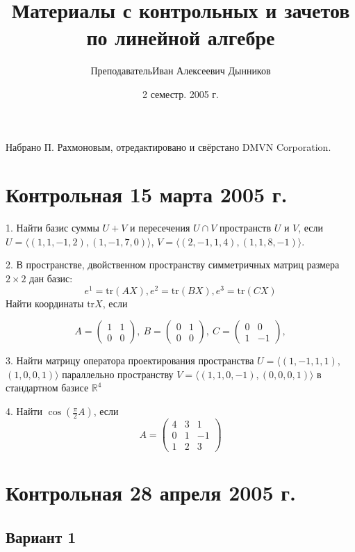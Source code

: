 \documentclass[a4paper]{article}
\title{Материалы с контрольных и зачетов по линейной алгебре}
\author{Преподаватель\т Иван Алексеевич Дынников}
\date{2 семестр. 2005 г.}
\begin{document}
\maketitle
\centerline{\small Набрано П. Рахмоновым, отредактировано и свёрстано DMVN Corporation.}

\medskip
\dmvntrail

\section{Контрольная 15 марта 2005 г.}

1. Найти базис суммы $U+V$ и пересечения $U\cap V$ пространств $U$
и $V$, если $U=\langle(1, 1, -1, 2), (1, -1, 7, 0)\rangle$,
$V=\langle(2, -1, 1, 4), (1, 1, 8, -1)\rangle$.

2. В пространстве, двойственном пространству симметричных матриц
размера $2\times 2$ дан базис:
$$
e^1=\text{tr}(AX), e^2=\text{tr}(BX), e^3=\text{tr}(CX)
$$
Найти координаты $\text{tr} X$, если

$$
A= \left(
\begin{array}{cc}
1 & 1\\
0 & 0
\end{array} \right) ,\ B= \left(
\begin{array}{cc}
0 & 1\\
0 & 0
\end{array} \right),\ C=\left(
\begin{array}{cc}
0 & 0\\
1 & -1
\end{array} \right),
$$


3. Найти матрицу оператора проектирования пространства
$U=\langle(1, -1, 1, 1)$, $(1, 0, 0, 1)\rangle$ параллельно
пространству $V=\langle(1, 1, 0, -1), (0, 0, 0, 1)\rangle$ в
стандартном базисе $\mathbb{R}^4$

4. Найти $\cos(\frac{\pi}{2}A)$, если $$ A= \left(
\begin{array}{ccc}
4 & 3 & 1\\
0 & 1 & -1 \\
1 & 2 & 3
\end{array} \right)  $$

\section{Контрольная 28 апреля 2005 г.}

\subsection{Вариант 1}
\end{document}
